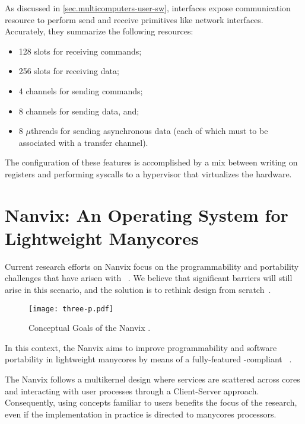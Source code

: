 	As discussed in \autoref{sec.multicomputers-user-sw}, \noc interfaces
	expose communication resource to perform send and receive primitives
	like network interfaces.
	Accurately, they summarize the following resources:

	\begin{itemize}
		\item 128 slots for receiving commands;
		\item 256 slots for receiving data;
		\item 4 channels for sending commands;
		\item 8 channels for sending data, and;
		\item 8 $\mu$threads for sending asynchronous data (each of which must
			to be associated with a transfer channel).
	\end{itemize}

	The configuration of these features is accomplished by a mix between
	writing on \dma registers and performing syscalls to a hypervisor
	that virtualizes the \mppa hardware.

\section{Nanvix: An Operating System for Lightweight Manycores}
\label{sec.nanvix}

	Current research efforts on Nanvix \os focus on the programmability and portability
	challenges that have arisen with \lightweight \manycores~\cite{christgau2017, gamell2012, serres2011}.
	We believe that significant barriers will still arise in this scenario, and the
	solution is to rethink \os design from scratch~\cite{penna:compas19, penna2019}.

	\begin{figure}[!tb]
		\centering%
		\caption{Conceptual Goals of the Nanvix \os.}%
		\label{fig:hal-struct}%
		\texttt{[image: three-p.pdf]}%
	\end{figure}


	In this context, the Nanvix \os aims to improve programmability and
	software portability in lightweight manycores by means of a fully-featured
	\posix-compliant \os~\cite{penna:compas19}.

	The Nanvix \os follows a multikernel design where \os services are scattered across cores and
	interacting with user processes through a Client-Server approach.
	Consequently, using concepts familiar to \os users benefits the focus of the research,
	even if the implementation in practice is directed to manycores processors.

